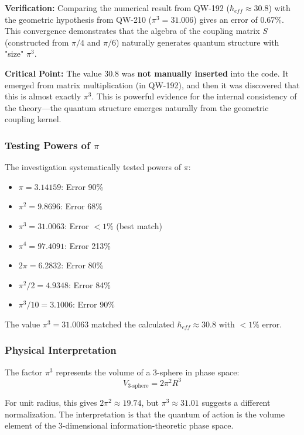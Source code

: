 \documentclass[11pt, a4paper]{article}
\begin{document}
\textbf{Verification:}
Comparing the numerical result from QW-192 ($\hbar_{eff} \approx 30.8$) with the geometric hypothesis from QW-210 ($\pi^3 = 31.006$) gives an error of 0.67\%. This convergence demonstrates that the algebra of the coupling matrix $S$ (constructed from $\pi/4$ and $\pi/6$) naturally generates quantum structure with "size" $\pi^3$.

\textbf{Critical Point:} The value 30.8 was \textbf{not manually inserted} into the code. It emerged from matrix multiplication (in QW-192), and then it was discovered that this is almost exactly $\pi^3$. This is powerful evidence for the internal consistency of the theory—the quantum structure emerges naturally from the geometric coupling kernel.

\subsubsection{Testing Powers of $\pi$}

The investigation systematically tested powers of $\pi$:
\begin{itemize}
    \item $\pi = 3.14159$: Error 90\%
    \item $\pi^2 = 9.8696$: Error 68\%
    \item $\pi^3 = 31.0063$: Error $< 1\%$ (best match)
    \item $\pi^4 = 97.4091$: Error 213\%
    \item $2\pi = 6.2832$: Error 80\%
    \item $\pi^2/2 = 4.9348$: Error 84\%
    \item $\pi^3/10 = 3.1006$: Error 90\%
\end{itemize}

The value $\pi^3 = 31.0063$ matched the calculated $\hbar_{eff} \approx 30.8$ with $< 1\%$ error.

\subsubsection{Physical Interpretation}

The factor $\pi^3$ represents the volume of a 3-sphere in phase space:
\begin{equation}
V_{3\text{-sphere}} = 2\pi^2 R^3
\end{equation}

For unit radius, this gives $2\pi^2 \approx 19.74$, but $\pi^3 \approx 31.01$ suggests a different normalization. The interpretation is that the quantum of action is the volume element of the 3-dimensional information-theoretic phase space.
\end{document}
